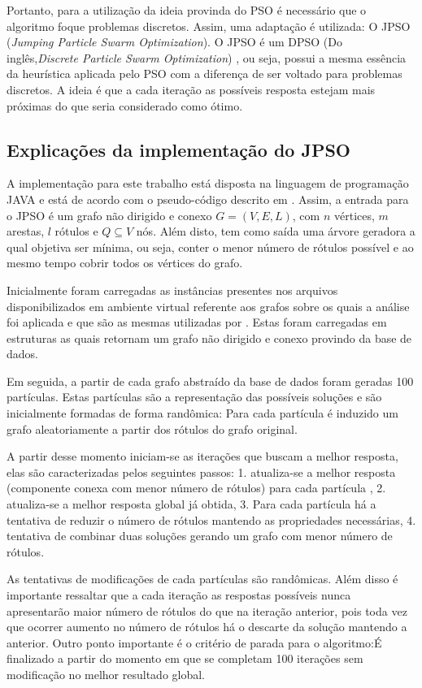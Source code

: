\documentclass{sig-alternate-05-2015}
\begin{document}
Portanto, para a utilização da ideia provinda do PSO  é necessário que o algoritmo foque problemas discretos. Assim, uma adaptação é utilizada: O JPSO (\textit{Jumping Particle Swarm Optimization}).
O JPSO  é um DPSO (Do inglês,\textit{Discrete Particle Swarm Optimization}) \cite{} , ou seja, possui 
a mesma essência da heurística aplicada pelo PSO com a diferença de ser voltado para problemas discretos. A ideia é que a cada iteração as possíveis resposta estejam mais próximas do que seria considerado como ótimo. 

\subsection{Explicações da implementação do JPSO}
A implementação para este trabalho está disposta na linguagem de programação JAVA  e está de acordo com o pseudo-código descrito em \cite{}. Assim, a entrada para o JPSO é um grafo não dirigido e conexo $G = (V,E,L)$, com $n$ vértices, 	$m$ arestas, $l$ rótulos e $Q \subseteq V$ nós. Além disto, tem como saída uma árvore geradora a qual objetiva ser mínima, ou seja, conter o menor número de rótulos possível e ao mesmo tempo cobrir todos os vértices do grafo. 

Inicialmente foram carregadas as instâncias presentes nos arquivos disponibilizados em ambiente virtual referente aos grafos sobre os quais a análise foi aplicada e que são as  mesmas utilizadas por \cite{}. Estas foram carregadas em estruturas as quais retornam um grafo não dirigido e conexo provindo da base de dados. 
	
Em seguida, a partir de cada grafo abstraído da base de dados foram geradas 100 partículas. Estas partículas são a representação das possíveis soluções e são inicialmente formadas de forma randômica: Para cada partícula é induzido um grafo aleatoriamente a partir dos rótulos do grafo original.

A partir desse momento iniciam-se as iterações que buscam a melhor resposta, elas são caracterizadas pelos seguintes passos: 1. atualiza-se a melhor resposta (componente conexa com menor número de rótulos) para cada partícula , 2. atualiza-se a melhor resposta global já obtida, 3. Para cada partícula há a tentativa de reduzir o número de rótulos mantendo as propriedades necessárias, 4. tentativa de combinar duas soluções gerando um grafo com menor número de rótulos.

As tentativas de modificações de cada partículas são randômicas. Além disso é importante ressaltar que a cada iteração as respostas possíveis nunca apresentarão maior número de rótulos do que na iteração anterior, pois toda vez que ocorrer aumento no número de rótulos há o descarte da solução mantendo a anterior. Outro ponto importante é o critério de parada para o algoritmo:É finalizado a partir do momento em que se completam 100 iterações sem modificação no melhor resultado global.
\end{document}

